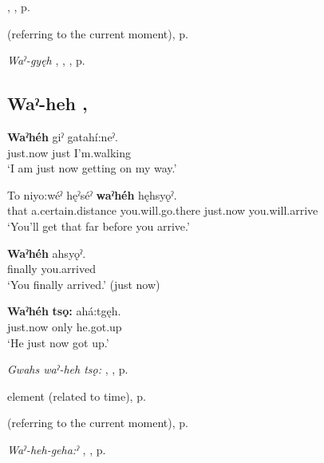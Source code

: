 \begin{CayugaRelated}
\item {} , , p. \pageref{p:[-gyęh]}\\
\item {} (referring to the current moment), p. \pageref{p:[waˀ-]}\\
\item \textit{Waˀ-gyęh} , , , p. \pageref{p:[waˀ-gyęh] ‘presently’}
\end{CayugaRelated}


\subsection*{\textbf{Waˀ-heh} , } \label{p:[waˀ-heh]}

\ea
\label{ex:wpart4}
\gll \textbf{Waˀhéh} giˀ gatahí:neˀ.\\
just.now just I’m.walking\\
\glt ‘I am just now getting on my way.’
\z


\ea
\label{ex:wpart5}
\gll To niyo:wéˀ hęˀséˀ \textbf{waˀhéh} hęhsyǫˀ.\\
that a.certain.distance you.will.go.there just.now you.will.arrive\\
\glt ‘You’ll get that far before you arrive.’
\z


\ea
\label{ex:wpart6}
\gll \textbf{Waˀhéh} ahsyǫˀ.\\
finally you.arrived\\
\glt ‘You finally arrived.’ (just now)
\z


\ea
\label{ex:wpart7}
\gll \textbf{Waˀhéh} \textbf{tsǫ:} ahá:tgęh.\\
just.now only he.got.up\\
\glt ‘He just now got up.’
\z

\largerpage
\begin{CayugaRelated}
\item \textit{Gwahs waˀ-heh tsǫ:} , , p. \pageref{p:[gwahs waˀ-heh tsǫ:]}\\
\item {} element (related to time), p. \pageref{p:[-heh]}\\
\item {} (referring to the current moment), p. \pageref{p:[waˀ-]}\\
\item \textit{Waˀ-heh-geha:ˀ} , , p. \pageref{p:[waˀ-heh-geha:ˀ]}
\end{CayugaRelated}



